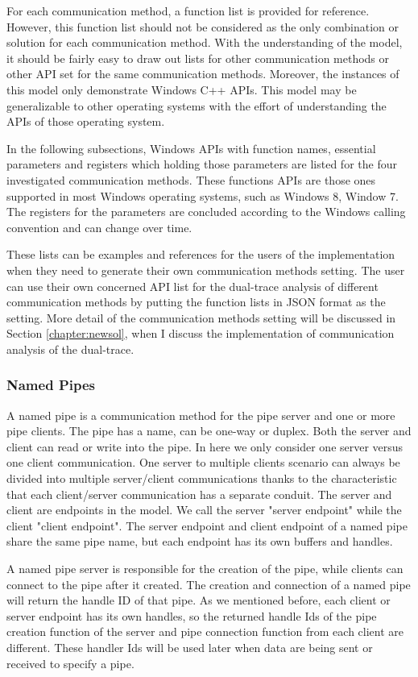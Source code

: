 For each communication method, a function list is provided for reference. However, this function list should not be considered as the only combination or solution for each communication method. With the understanding of the model, it should be fairly easy to draw out lists for other
communication methods or other API set for the same communication methods. Moreover, the
instances of this model only demonstrate Windows C++ APIs. This model may be generalizable
to other operating systems with the effort of understanding the APIs of those operating system.

In the following subsections, Windows APIs with function names, essential parameters and
registers which holding those parameters are listed for the four investigated communication methods. These functions APIs are those ones supported in most Windows operating systems, such as
Windows 8, Window 7. The registers for the parameters are concluded according to the Windows
calling convention and can change over time.

These lists can be examples and references for the users of the implementation when they need
to generate their own communication methods setting. The user can use their own concerned API
list for the dual-trace analysis of different communication methods by putting the function lists
in JSON format as the setting. More detail of the communication methods setting will be discussed in Section \ref{chapter:newsol}, when I discuss the implementation of communication analysis of the dual-trace.

\subsubsection{Named Pipes}
A named pipe is a communication method for the pipe server and one or more pipe clients. The pipe has a name, can be one-way or duplex. Both the server and client can read or write into the pipe.\cite{WinNamedpipe} In here we only consider one server versus one client communication. One server to multiple clients scenario can always be divided into multiple server/client communications thanks to the characteristic that each client/server communication has a separate conduit. The server and client are endpoints in the model. We call the server "server endpoint" while the client "client endpoint". The server endpoint and client endpoint of a named pipe share the same pipe name, but each endpoint has its own buffers and handles. 

A named pipe server is responsible for the creation of the pipe, while clients can connect to the pipe after it created. The creation and connection of a named pipe will return the handle ID of that pipe. As we mentioned before, each client or server endpoint has its own handles, so the returned handle Ids of the pipe creation function of the server and pipe connection function from each client are different. These handler Ids will be used later when data are being sent or received to specify a pipe.

